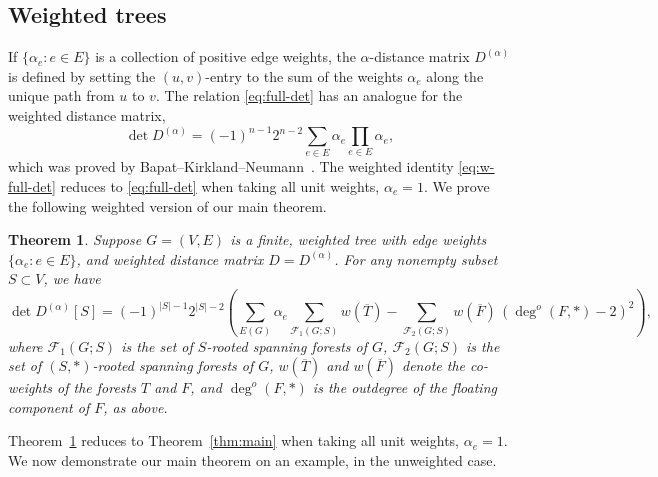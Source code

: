 \documentclass{amsart}
\newtheorem{thm}{Theorem}[section]
\theoremstyle{definition}
\newcommand{\Da}{{D^{(\alpha)}}}
\newcommand{\trees}{\mathcal{F}_1}
\newcommand{\forests}{\mathcal{F}}
\newcommand{\degout}{\deg^o}
\begin{document}
\subsection{Weighted trees}
If $\{\alpha_e : e\in E\}$ is a collection of positive edge weights,  the $\alpha$-distance matrix $\Da$ 
is defined by setting the $(u,v)$-entry to the sum of the weights $\alpha_e$ along the unique path from $u$ to $v$.
The relation \eqref{eq:full-det}
has an analogue for the weighted distance matrix, 
\begin{equation}\label{eq:w-full-det}
	\det \Da = (-1)^{n-1} 2^{n-2} \sum_{e \in E} \alpha_e \prod_{e \in E} \alpha_e ,
\end{equation}
which was proved by Bapat--Kirkland--Neumann~\cite{bapat-kirkland-neumann}.
The weighted identity \eqref{eq:w-full-det} reduces to \eqref{eq:full-det} when taking all unit weights, $\alpha_e = 1$.
We prove the following weighted version of our main theorem.
\begin{thm}
\label{thm:w-main}
Suppose $G = (V,E)$ is a finite, weighted tree with edge weights $\{\alpha_e : e \in E\}$, and weighted distance matrix $D = \Da$. 
For any nonempty subset $S \subset V$, we have
\begin{equation}\label{eq:w-main}
	\det \Da[S] = (-1)^{|S|-1} 2^{|S|-2} \left( \sum_{E(G)}\alpha_e \sum_{\trees(G;S)} w(\overline{T}) - \sum_{\forests_2(G;S)} w(\overline{F})\, (\degout(F,*) - 2)^2 \right),
\end{equation}
where 
$\trees(G;S)$ is the set of $S$-rooted spanning forests of $G$,
$\forests_2(G;S)$ is the set of $(S,*)$-rooted spanning forests of $G$,
$w(\overline{T})$ and $w(\overline{F})$ denote the co-weights of the forests $T$ and $F$,
and 
$\degout(F, *)$ is the outdegree of the floating component of $F$, as above.
\end{thm}
Theorem~\ref{thm:w-main} reduces to Theorem~\ref{thm:main} when taking all unit weights, $\alpha_e = 1$.
We now demonstrate our main theorem on an example, in the unweighted case.
\end{document}
